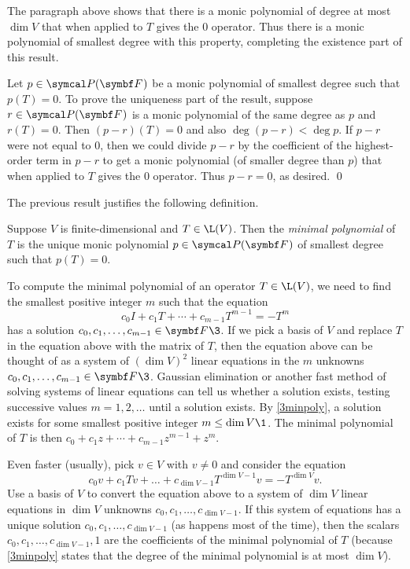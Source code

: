\pagebreak[3]

The paragraph above shows that there is a monic polynomial of degree at most $\dim V$ that when applied to $T$ gives the $0$ operator. Thus there is a monic polynomial of smallest degree with this property, completing the existence part of this result.

Let $p \in \P(\F{})$ be a monic polynomial of smallest degree such that \mbox{$p(T) = 0$}. To prove the uniqueness part of the result, suppose $r \in \P(\F{})$ is a monic polynomial of the same degree as $p$ and $r(T) = 0$. Then $(p - r)(T) = 0$ and also
\mbox{$\deg (p - r) < \deg p$}. If $p-r$ were not equal to $0$, then we could divide $p-r$ by the coefficient of the highest-order term in $p-r$ to get a monic polynomial (of smaller degree than $p$) that when applied to $T$ gives the $0$ operator. Thus $p-r = 0$, as desired.
\qed

The previous result justifies the following definition.

{Suppose $V$ is finite-dimensional and $T \in \L(V)$. Then the \emph{minimal polynomial} of $T$ is the unique monic polynomial
$p \in \P(\F{})$ of smallest degree such that $p(T) = 0$.}

To compute the minimal polynomial of an operator $T \in \L(V)$, we need to find the smallest positive integer $m$ such that the equation
\[
c_0 I + c_1 T + \cdots + c_{m-1} T^{m-1} = -T^m
\]
has a solution $c_0, c_1, \ldots, c_{m-1} \in \F{}\3$. If we pick a basis of $V$ and replace $T$ in the equation above with the matrix of $T$, then the equation above can be thought of as a system of $(\dim V)^2$ linear equations in the $m$ unknowns
$c_0, c_1, \ldots, c_{m-1} \in \F{}\3$. Gaussian elimination or another fast method of solving systems of linear equations can tell us whether a solution exists, testing successive values $m = 1, 2, \ldots$ until a solution exists. By \ref{3minpoly}, a solution exists for some smallest positive integer $m \le \dim V\1$. The minimal polynomial of $T$ is then $c_0 + c_1 z + \cdots + c_{m-1} z^{m-1} + z^m\!$.

Even faster (usually), pick $v \in V$ with $v \ne 0$ and consider the equation
\begin{equation} \label{2simul}
c_0 v + c_1 Tv + \dots + c_{\dim V-1} T^{\dim V-1} v= -T^{\dim V} v.
\end{equation}
Use a basis of $V$ to convert the equation above to a system of $\dim V$ linear equations in $\dim V$ unknowns
$c_0, c_1, \ldots, c_{\dim V-1}$. If this system of equations has a unique solution $c_0, c_1, \dots, c_{\dim V-1}$ (as happens
most of the time), then the scalars $c_0, c_1, \dots, c_{\dim V-1}, 1$ are the coefficients of the minimal polynomial of $T$ (because \ref{3minpoly} states that the degree of the minimal polynomial is at most $\dim V$).

